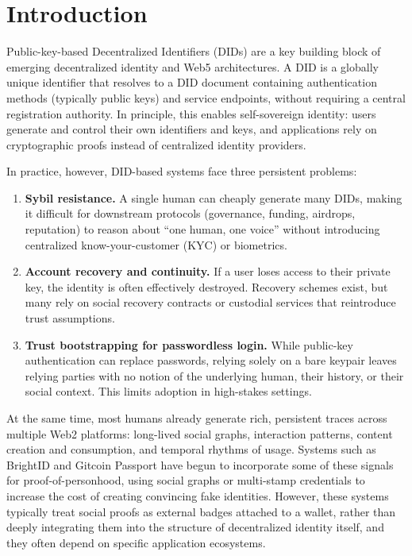 \documentclass[11pt]{article}
\begin{document}
\section{Introduction}

Public-key-based Decentralized Identifiers (DIDs) are a key building block of emerging decentralized identity and Web5 architectures. A DID is a globally unique identifier that resolves to a DID document containing authentication methods (typically public keys) and service endpoints, without requiring a central registration authority.\cite{w3c_did_core} In principle, this enables self-sovereign identity: users generate and control their own identifiers and keys, and applications rely on cryptographic proofs instead of centralized identity providers.

In practice, however, DID-based systems face three persistent problems:

\begin{enumerate}[label=(P\arabic*)]
  \item \textbf{Sybil resistance.} A single human can cheaply generate many DIDs, making it difficult for downstream protocols (governance, funding, airdrops, reputation) to reason about ``one human, one voice'' without introducing centralized know-your-customer (KYC) or biometrics.\cite{gitcoin_passport_sybil,brightid_about}
  \item \textbf{Account recovery and continuity.} If a user loses access to their private key, the identity is often effectively destroyed. Recovery schemes exist, but many rely on social recovery contracts or custodial services that reintroduce trust assumptions.
  \item \textbf{Trust bootstrapping for passwordless login.} While public-key authentication can replace passwords, relying solely on a bare keypair leaves relying parties with no notion of the underlying human, their history, or their social context. This limits adoption in high-stakes settings.
\end{enumerate}

At the same time, most humans already generate rich, persistent traces across multiple Web2 platforms: long-lived social graphs, interaction patterns, content creation and consumption, and temporal rhythms of usage. Systems such as BrightID and Gitcoin Passport have begun to incorporate some of these signals for proof-of-personhood, using social graphs or multi-stamp credentials to increase the cost of creating convincing fake identities.\cite{brightid_about,gitcoin_passport_blog} However, these systems typically treat social proofs as external badges attached to a wallet, rather than deeply integrating them into the structure of decentralized identity itself, and they often depend on specific application ecosystems.
\end{document}
